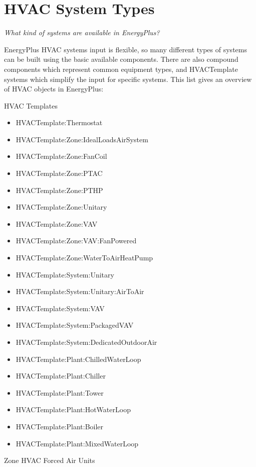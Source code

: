 \section{HVAC System Types}\label{hvac-system-types}

\emph{What kind of systems are available in EnergyPlus?}

EnergyPlus HVAC systems input is flexible, so many different types of systems can be built using the basic available components. There are also compound components which represent common equipment types, and HVACTemplate systems which simplify the input for specific systems. This list gives an overview of HVAC objects in EnergyPlus:

HVAC Templates

\begin{itemize}
\tightlist
\item
  HVACTemplate:Thermostat
\item
  HVACTemplate:Zone:IdealLoadsAirSystem
\item
  HVACTemplate:Zone:FanCoil
\item
  HVACTemplate:Zone:PTAC
\item
  HVACTemplate:Zone:PTHP
\item
  HVACTemplate:Zone:Unitary
\item
  HVACTemplate:Zone:VAV
\item
  HVACTemplate:Zone:VAV:FanPowered
\item
  HVACTemplate:Zone:WaterToAirHeatPump
\item
  HVACTemplate:System:Unitary
\item
  HVACTemplate:System:Unitary:AirToAir
\item
  HVACTemplate:System:VAV
\item
  HVACTemplate:System:PackagedVAV
\item
  HVACTemplate:System:DedicatedOutdoorAir
\item
  HVACTemplate:Plant:ChilledWaterLoop
\item
  HVACTemplate:Plant:Chiller
\item
  HVACTemplate:Plant:Tower
\item
  HVACTemplate:Plant:HotWaterLoop
\item
  HVACTemplate:Plant:Boiler
\item
  HVACTemplate:Plant:MixedWaterLoop
\end{itemize}

Zone HVAC Forced Air Units

